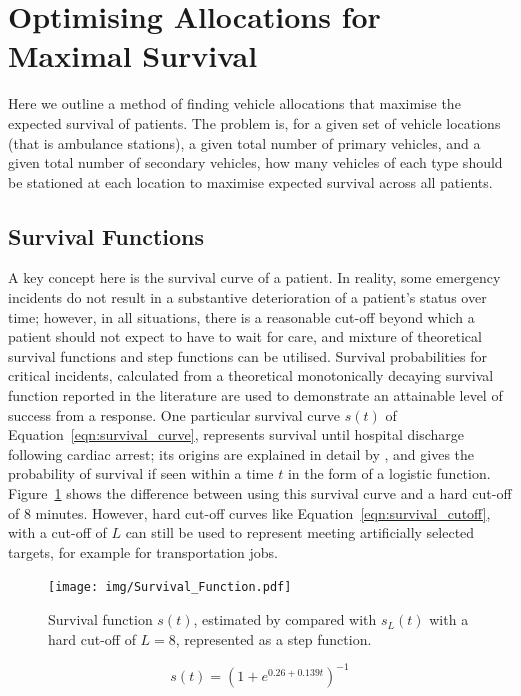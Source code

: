 \documentclass[numbers,webpdf,imaman]{ima-authoring-template}%
\begin{document}
\section{Optimising Allocations for Maximal Survival}\label{sec:optimising}
Here we outline a method of finding vehicle allocations that maximise the
expected survival of patients.
The problem is, for a given set of vehicle locations (that is ambulance
stations), a given total number of primary vehicles, and a given total number
of secondary vehicles, how many vehicles of each type should be stationed at
each location to maximise expected survival across all patients.


\subsection{Survival Functions}\label{sec:survival}
A key concept here is the survival curve of a patient.
In reality, some emergency incidents do not result in a substantive
deterioration of a patient’s status over time; however, in all situations,
there is a reasonable cut-off beyond which a patient should not expect to have
to wait for care, and mixture of theoretical survival functions and step
functions can be utilised.
Survival probabilities for critical incidents, calculated from a theoretical
monotonically decaying survival function reported in the literature
\citep{Valenzuela20001206} are used to demonstrate an attainable level of
success from a response. One particular survival curve $s(t)$ of
Equation~\ref{eqn:survival_curve}, represents survival until hospital
discharge following cardiac arrest; its origins are explained in detail by
\citet{Knight2012918}, and gives the probability of survival if seen within a
time $t$ in the form of a logistic function. Figure~\ref{fig:survivalfunction}
shows the difference between using this survival curve and a hard cut-off of 8
minutes.
However, hard cut-off curves like Equation~\ref{eqn:survival_cutoff}, with a
cut-off of $L$ can still be used to represent meeting artificially selected
targets, for example for transportation jobs.

\begin{figure}
\centering
\texttt{[image: img/Survival\_Function.pdf]}
\caption{Survival function $s(t)$, estimated by \citet{Valenzuela20001206}
compared with $s_L(t)$ with a hard cut-off of $L=8$, represented as a step
function.}
\label{fig:survivalfunction}
\end{figure}

\begin{equation}\label{eqn:survival_curve}
    s(t) = \left(1 + e^{0.26+0.139t}\right)^{-1}
\end{equation}
\end{document}
